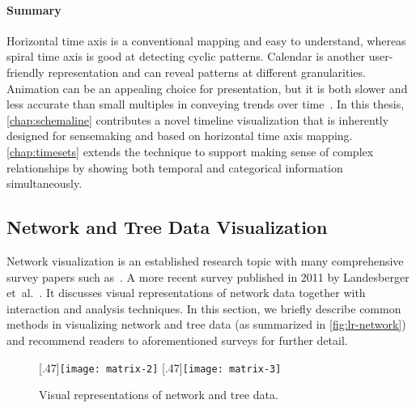 \paragraph{Summary} Horizontal time axis is a conventional mapping and easy to understand, whereas spiral time axis is good at detecting cyclic patterns. Calendar is another user-friendly representation and can reveal patterns at different granularities. Animation can be an appealing choice for presentation, but it is both slower and less accurate than small multiples in conveying trends over time~\cite{Robertson2008}. In this thesis, \autoref{chap:schemaline} contributes a novel timeline visualization that is inherently designed for sensemaking and based on horizontal time axis mapping. \autoref{chap:timesets} extends the technique to support making sense of complex relationships by showing both temporal and categorical information simultaneously.

\subsection{Network and Tree Data Visualization}
Network visualization is an established research topic with many comprehensive survey papers such as~\cite{Herman2000}. A more recent survey published in 2011 by Landesberger et~al.~\cite{Landesberger2011}. It discusses visual representations of network data together with interaction and analysis techniques. In this section, we briefly describe common methods in visualizing network and tree data (as summarized in \autoref{fig:lr-network}) and recommend readers to aforementioned surveys for further detail.

\begin{figure}[t]
	\centering
	[.47\columnwidth]{\texttt{[image: matrix-2]}}
	\hfill
	[.47\columnwidth]{\texttt{[image: matrix-3]}}
	\\ \vspace{.5\baselineskip}
	\caption{Visual representations of network and tree data.}
	\label{fig:lr-network}
\end{figure}

